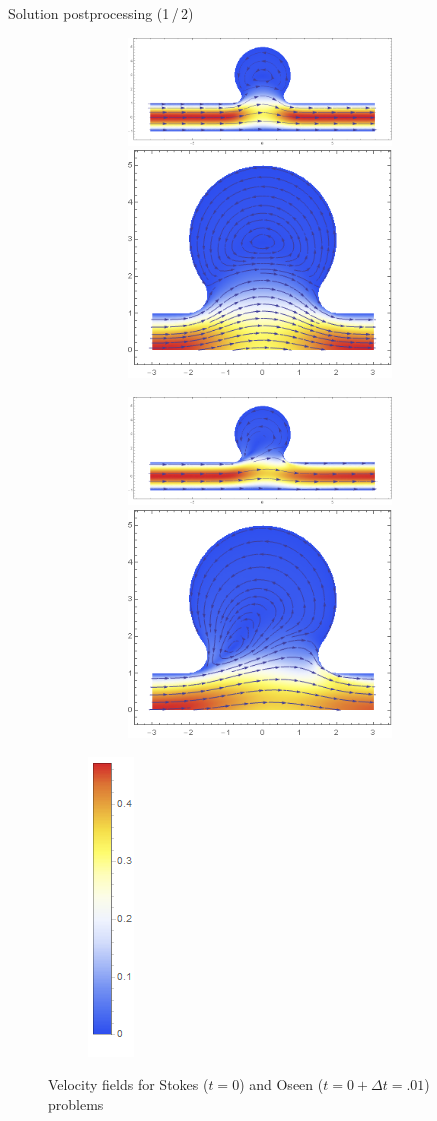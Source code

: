 \documentclass[svgnames]{beamer} %
\begin{document}
		\begin{frame}{Solution postprocessing (1\,/\,2)}
			\begin{figure}
				\begin{subfigure}{.9\linewidth}
					\begin{subfigure}{1.\linewidth}\centering
						\includegraphics[height=70bp]{chd_u_0.png}\quad
						\includegraphics[height=70bp]{chd_u_0_zoom.png}
					\end{subfigure}%
					\par\bigskip
					\begin{subfigure}{1.\linewidth}\centering
						\includegraphics[height=70bp]{chd_u_1.png}\quad
						\includegraphics[height=70bp]{chd_u_1_zoom.png}
					\end{subfigure}%
				\end{subfigure}%
				\begin{subfigure}{.1\linewidth}\centering
					\includegraphics[height=100bp]{chd_u_bar.png}
				\end{subfigure}%
				\caption{
					Velocity fields for Stokes ($t = 0$) and Oseen ($t = 0 + \Delta t = .01$) problems
				}
				\label{fig:chd_u}
			\end{figure}
		\end{frame}
		
\end{document}
